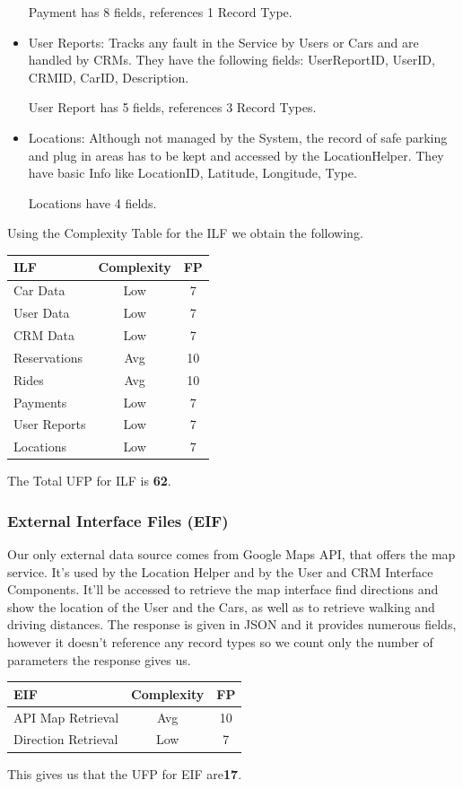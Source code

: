 \documentclass[a4paper]{article}
\begin{document}
\begin{itemize}
\par Payment has 8 fields, references 1 Record Type.
\item User Reports: Tracks any fault in the Service by Users or Cars and are handled by CRMs. They have the following fields: UserReportID, UserID, CRMID, CarID, Description.
\par User Report has 5 fields, references 3 Record Types.
\item Locations: Although not managed by the System, the record of safe parking and plug in areas has to be kept and accessed by the LocationHelper. They have basic Info like LocationID, Latitude, Longitude, Type.
\par Locations have 4 fields.
\end{itemize}
\newpage
Using the Complexity Table for the ILF we obtain the following.
\begin{center}
\begin{tabular}{ | l | c | c | }
\hline
	\textbf{ILF} & \textbf{Complexity} & \textbf{FP} \\ \hline\hline
	Car Data & Low & 7 \\ \hline
	User Data & Low & 7  \\ \hline
	CRM Data & Low & 7  \\ \hline
	Reservations & Avg & 10  \\ \hline
	Rides & Avg & 10 \\ \hline
	Payments & Low & 7  \\ \hline
	User Reports & Low &  7  \\ \hline
	Locations & Low & 7  \\ \hline
\end{tabular}
\end{center}
The Total UFP for ILF is \textbf{62}.

\subsubsection{External Interface Files (EIF)}
Our only external data source comes from Google Maps API, that offers the map service. It's used by the Location Helper and by the User and CRM Interface Components. It'll be accessed to retrieve the map interface find directions and show the location of the User and the Cars, as well as to retrieve walking and driving distances. The response is given in JSON and it provides numerous fields, however it doesn't reference any record types so we count only the number of parameters the response gives us.
\begin{center}
\begin{tabular}{ | l | c | c | }
\hline
	\textbf{EIF} & \textbf{Complexity} & \textbf{FP} \\ \hline\hline
	API Map Retrieval & Avg & 10 \\ \hline
	Direction Retrieval & Low & 7 \\ \hline
\end{tabular}
\end{center}
This gives us that the UFP for EIF are\textbf{17}.
\end{document}
